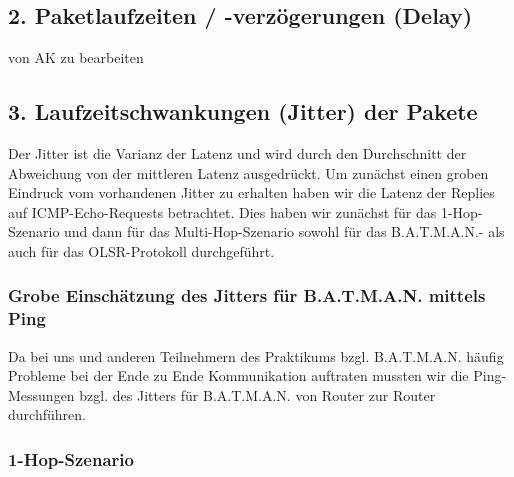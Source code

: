 \documentclass[a4paper,10pt]{article}
\begin{document}
\subsection{2. Paketlaufzeiten / -verzögerungen (Delay)}

von AK zu bearbeiten

%
%
%
%
%
%
%
%
%
%
%
\subsection{3. Laufzeitschwankungen (Jitter) der Pakete}

Der Jitter ist die Varianz der Latenz und wird durch den Durchschnitt der Abweichung von der mittleren Latenz ausgedrückt.
Um zunächst einen groben Eindruck vom vorhandenen Jitter zu erhalten haben wir die Latenz der Replies auf ICMP-Echo-Requests betrachtet.
Dies haben wir zunächst für das 1-Hop-Szenario und dann für das Multi-Hop-Szenario sowohl für das B.A.T.M.A.N.- als auch für das OLSR-Protokoll durchgeführt.

\subsubsection{Grobe Einschätzung des Jitters für B.A.T.M.A.N. mittels Ping}

Da bei uns und anderen Teilnehmern des Praktikums bzgl. B.A.T.M.A.N. häufig Probleme bei der Ende zu Ende Kommunikation auftraten mussten wir die Ping-Messungen bzgl. des Jitters für B.A.T.M.A.N. von Router zur Router durchführen.

\subsubsection*{1-Hop-Szenario}
\end{document}
